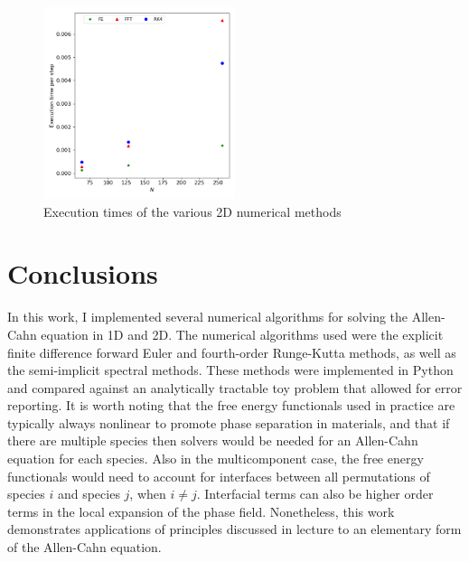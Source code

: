\documentclass[12pt]{article}
\begin{document}
\begin{figure}
    \centering
    \includegraphics[width=0.5\textwidth]{../figures/AC2D_exec_time.png}
    \caption{Execution times of the various 2D numerical methods}
    \label{fig:2d_exec_time}
\end{figure}

\section{Conclusions}
In this work, I implemented several numerical algorithms for solving the Allen-Cahn equation in 1D and 2D.
The numerical algorithms used were the explicit finite difference forward Euler and fourth-order Runge-Kutta methods, as well as the semi-implicit spectral methods.
These methods were implemented in Python and compared against an analytically tractable toy problem that allowed for error reporting.
It is worth noting that the free energy functionals used in practice are typically always nonlinear to promote phase separation in materials, and that if there are multiple species then solvers would be needed for an Allen-Cahn equation for each species.
Also in the multicomponent case, the free energy functionals would need to account for interfaces between all permutations of species $i$ and species $j$, when $i\neq j$.
Interfacial terms can also be higher order terms in the local expansion of the phase field.
Nonetheless, this work demonstrates applications of principles discussed in lecture to an elementary form of the Allen-Cahn equation.

\newpage
\printbibliography
\end{document}
